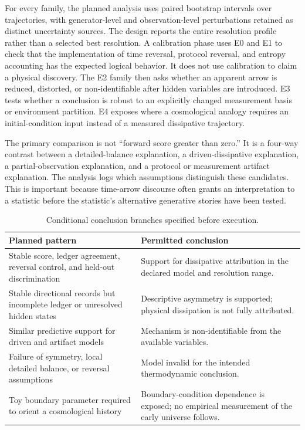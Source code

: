 For every family, the planned analysis uses paired bootstrap intervals over trajectories, with generator-level and observation-level perturbations retained as distinct uncertainty sources. The design reports the entire resolution profile rather than a selected best resolution. A calibration phase uses E0 and E1 to check that the implementation of time reversal, protocol reversal, and entropy accounting has the expected logical behavior. It does not use calibration to claim a physical discovery. The E2 family then asks whether an apparent arrow is reduced, distorted, or non-identifiable after hidden variables are introduced. E3 tests whether a conclusion is robust to an explicitly changed measurement basis or environment partition. E4 exposes where a cosmological analogy requires an initial-condition input instead of a measured dissipative trajectory.

The primary comparison is not ``forward score greater than zero.'' It is a four-way contrast between a detailed-balance explanation, a driven-dissipative explanation, a partial-observation explanation, and a protocol or measurement artifact explanation. The analysis logs which assumptions distinguish these candidates. This is important because time-arrow discourse often grants an interpretation to a statistic before the statistic's alternative generative stories have been tested.

\begin{table}[!t]
\caption{Conditional conclusion branches specified before execution.}
\label{tab:branches}
\centering
\footnotesize
\begin{tabularx}{\columnwidth}{p{}Y}
\toprule
\textbf{Planned pattern} & \textbf{Permitted conclusion}\\
\midrule
Stable score, ledger agreement, reversal control, and held-out discrimination & Support for dissipative attribution in the declared model and resolution range.\\
Stable directional records but incomplete ledger or unresolved hidden states & Descriptive asymmetry is supported; physical dissipation is not fully attributed.\\
Similar predictive support for driven and artifact models & Mechanism is non-identifiable from the available variables.\\
Failure of symmetry, local detailed balance, or reversal assumptions & Model invalid for the intended thermodynamic conclusion.\\
Toy boundary parameter required to orient a cosmological history & Boundary-condition dependence is exposed; no empirical measurement of the early universe follows.\\
\bottomrule
\end{tabularx}
\end{table}

